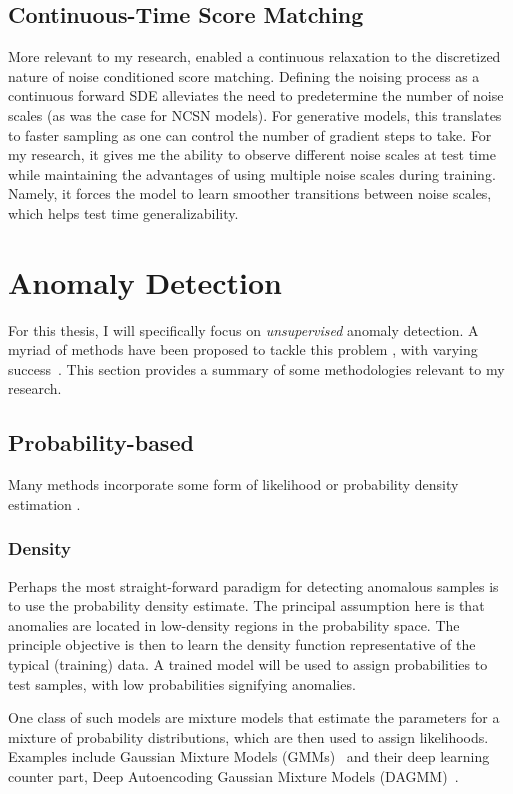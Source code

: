 \subsection*{Continuous-Time Score Matching}
More relevant to my research, \cite{song2020score} enabled a continuous relaxation to the discretized nature of noise conditioned score matching. Defining the noising process as a continuous forward SDE alleviates the need to predetermine the number of noise scales (as was the case for NCSN models). For generative models, this translates to faster sampling as one can control the number of gradient steps to take. For my research, it gives me the ability to observe different noise scales at test time while maintaining the advantages of using multiple noise scales during training. Namely, it forces the model to learn smoother transitions between noise scales, which helps test time generalizability.

\section{Anomaly Detection}

For this thesis, I will specifically focus on \textit{unsupervised} anomaly detection. A myriad of methods have been proposed to tackle this problem \cite{pang_deep_2021,ruff_unifying_2021}, with varying success~\cite{han2022adbench}. This section provides a summary of some methodologies relevant to my research.

\subsection{Probability-based}

Many methods incorporate some form of likelihood or probability density estimation . 

\subsubsection*{Density}
Perhaps the most straight-forward paradigm for detecting anomalous samples is to use the probability density estimate. The principal assumption here is that anomalies are located in low-density regions in the probability space. The principle objective is then to learn the density function representative of the typical (training) data. A trained model will be used to assign probabilities to test samples, with low probabilities signifying anomalies.


One class of such models are mixture models that estimate the parameters for a mixture of probability distributions, which are then used to assign likelihoods.
Examples include Gaussian Mixture Models (GMMs)~\cite{reynolds2009gaussian} and their deep learning counter part, Deep Autoencoding Gaussian Mixture Models (DAGMM)~\cite{zong2018deep}.

